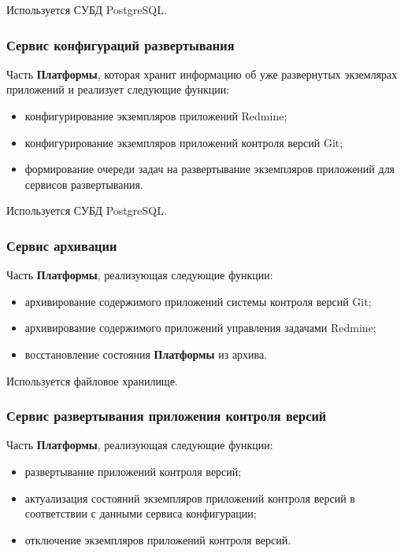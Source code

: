Используется СУБД PostgreSQL.

\subsubsection*{Сервис конфигураций развертывания}

Часть \textbf{Платформы}, которая хранит информацию об уже развернутых экземлярах приложений и реализует следующие функции:
\begin{itemize}
	\item конфигурирование экземпляров приложений Redmine;
	\item конфигурирование экземпляров приложений контроля версий Git;
	\item формирование очереди задач на развертывание экземпляров приложений для сервисов  развертывания.
\end{itemize}


Используется СУБД PostgreSQL.

\subsubsection*{Сервис архивации}

Часть \textbf{Платформы}, реализующая следующие функции:
\begin{itemize}
	\item архивирование содержимого приложений системы контроля версий Git; 
	\item архивирование содержимого приложений управления задачами Redmine;
	\item восстановление состояния \textbf{Платформы} из архива.
\end{itemize}

Используется файловое хранилище.

\subsubsection*{Сервис развертывания приложения контроля версий}

Часть \textbf{Платформы}, реализующая следующие функции:
\begin{itemize}
	\item развертывание приложений контроля версий;
	\item актуализация состояний экземпляров приложений контроля версий в соответствии с данными сервиса конфигурации;
	\item отключение экземпляров приложений контроля версий.
\end{itemize}

